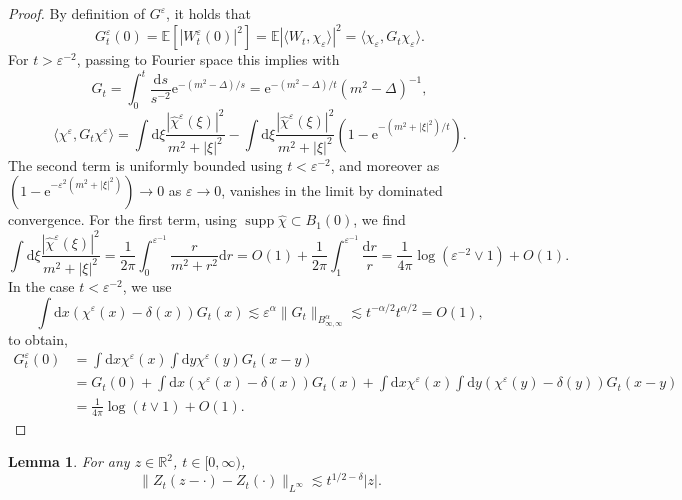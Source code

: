 \documentclass[11pt, a4paper]{scrartcl}
\numberwithin{equation}{section}
\theoremstyle{plain}
\newtheorem{lemma}[foo]{Lemma}
\theoremstyle{remark}
\newcommand{\mathd}{\mathrm{d}}
\newcommand{\mathe}{\mathrm{e}}
\newcommand{\tmop}[1]{\ensuremath{\operatorname{#1}}}
\begin{document}
\begin{proof}
  By definition of $G^{\varepsilon}$, it holds that
  \[ G_t^{\varepsilon} (0) =\mathbb{E} [| W_t^{\varepsilon} (0) |^2]
     =\mathbb{E} | \langle W_t, \chi_{\varepsilon} \rangle |^2 = \langle
     \chi_{\varepsilon}, G_t \chi_{\varepsilon} \rangle . \]
  For $t > \varepsilon^{- 2}$, passing to Fourier space this implies with \[G_t
  = \int_0^t \frac{\mathd s}{s^{- 2}} \mathe^{- (m^2 - \Delta) / s} =
  \mathe^{- (m^2 - \Delta) / t} (m^2 - \Delta)^{- 1},\]
  \[ \langle \chi^{\varepsilon}, G_t \chi^{\varepsilon} \rangle = \int \mathd
     \xi \frac{| \hat{\chi}^{\varepsilon} (\xi) |^2}{m^2 + | \xi |^2} - \int
     \mathd \xi \frac{| \hat{\chi}^{\varepsilon} (\xi) |^2}{m^2 + | \xi |^2}
     (1 - \mathe^{- (m^2 + | \xi |^2) / t}) . \]
  The second term is uniformly bounded using $t < \varepsilon^{- 2}$, and
  moreover as $(1 - \mathe^{- \varepsilon^2 (m^2 + | \xi |^2)}) \rightarrow 0$
  as $\varepsilon \rightarrow 0$, vanishes in the limit by dominated
  convergence. For the first term, using $\tmop{supp} \hat{\chi} \subset B_1
  (0)$, we find
  \[ \int \mathd \xi \frac{| \hat{\chi}^{\varepsilon} (\xi) |^2}{m^2 + | \xi
     |^2} = \frac{1}{2 \pi} \int_0^{\varepsilon^{- 1}} \frac{r}{m^2 + r^2}
     \mathd r = O (1) + \frac{1}{2 \pi} \int_1^{\varepsilon^{- 1}}
     \frac{\mathd r}{r} = \frac{1}{4 \pi} \log (\varepsilon^{- 2} \vee 1) + O
     (1) . \]
  In the case $t < \varepsilon^{- 2}$, we use
  \[ \int \mathd x (\chi^{\varepsilon} (x) - \delta (x)) G_t (x) \lesssim
     \varepsilon^{\alpha} \| G_t \|_{B^{\alpha}_{\infty, \infty}} \lesssim
     t^{- \alpha / 2} t^{\alpha / 2} = O (1), \]
  to obtain,
  \[ \begin{aligned}
       G_t^{\varepsilon} (0) &= \int \mathd x \chi^{\varepsilon} (x) \int
       \mathd y \chi^{\varepsilon} (y) G_t (x - y)\\
       &= G_t (0) + \int \mathd x (\chi^{\varepsilon} (x) - \delta (x))
       G_t (x) + \int \mathd x \chi^{\varepsilon} (x) \int \mathd y
       (\chi^{\varepsilon} (y) - \delta (y)) G_t (x - y)\\
       &= \frac{1}{4 \pi} \log (t \vee 1) + O (1) .
     \end{aligned} \]
  
\end{proof}

\begin{lemma}
  \label{lem:Z-Linfty}For any $z \in \mathbb{R}^2$, $t \in [0, \infty)$,
  \[ \| Z_t (z - \cdot) - Z_t (\cdot) \|_{L^{\infty}} \lesssim t^{1 / 2 -
     \delta} | z | . \]
\end{lemma}
\end{document}

